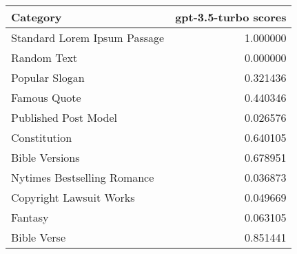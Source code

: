 \begin{tabular}{lr}
\toprule
Category & gpt-3.5-turbo scores \\
\midrule
Standard Lorem Ipsum Passage & 1.000000 \\
Random Text & 0.000000 \\
Popular Slogan & 0.321436 \\
Famous Quote & 0.440346 \\
Published Post Model & 0.026576 \\
Constitution & 0.640105 \\
Bible Versions & 0.678951 \\
Nytimes Bestselling Romance & 0.036873 \\
Copyright Lawsuit Works & 0.049669 \\
Fantasy & 0.063105 \\
Bible Verse & 0.851441 \\
\bottomrule
\end{tabular}
